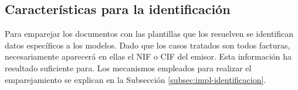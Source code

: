 
\subsection{Características para la identificación}

Para emparejar los documentos con las plantillas que los resuelven se identifican datos específicos a los modelos. Dado que los casos tratados son todos facturas, necesariamente aparecerá en ellas el NIF o CIF del emisor. Esta información ha resultado suficiente para. Los mecanismos empleados para realizar el emparejamiento se explican en la Subsección \ref{subsec:impl-identificacion}.

